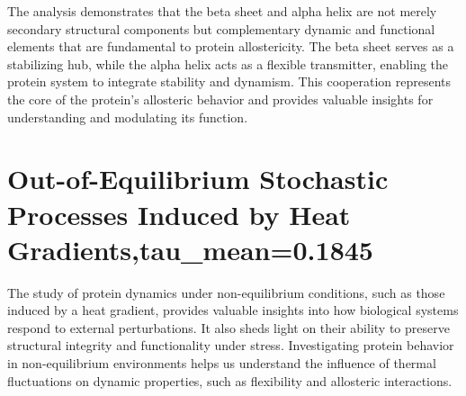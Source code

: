 \documentclass[English, Lau, oneside]{sapthesis}
\begin{document}
The analysis demonstrates that the beta sheet and alpha helix are not merely secondary structural components but complementary dynamic and functional elements that are fundamental to protein allostericity. The beta sheet serves as a stabilizing hub, while the alpha helix acts as a flexible transmitter, enabling the protein system to integrate stability and dynamism. This cooperation represents the core of the protein's allosteric behavior and provides valuable insights for understanding and modulating its function.
\begin{center}
    \end{center}


\newpage
\chapter{Out-of-Equilibrium Stochastic Processes Induced by Heat Gradients,tau_mean=0.1845}


The study of protein dynamics under non-equilibrium conditions, such as those induced by a heat gradient, provides valuable insights into how biological systems respond to external perturbations. It also sheds light on their ability to preserve structural integrity and functionality under stress. Investigating protein behavior in non-equilibrium environments helps us understand the influence of thermal fluctuations on dynamic properties, such as flexibility and allosteric interactions.
\end{document}

